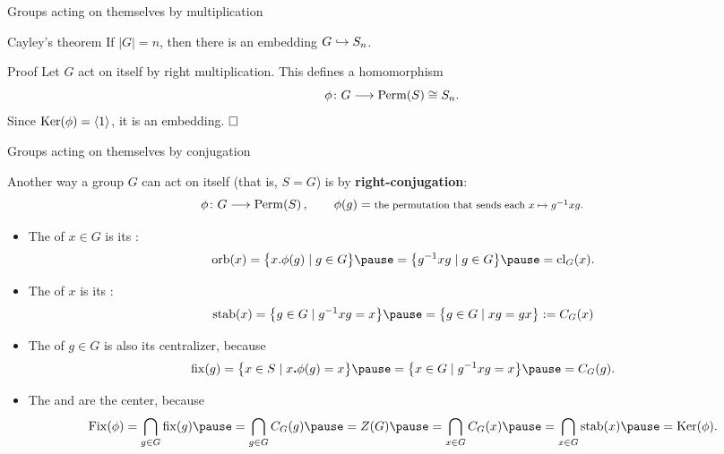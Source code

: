 \documentclass[8pt, handout]{beamer}
\newcommand{\Pause}{\pause}      %
\begin{document}
\begin{frame}{Groups acting on themselves by multiplication}
  \vspace{-1mm}\Pause
  
  \begin{block}{Cayley's theorem}
    If $|G|=n$, then there is an embedding $G\hookrightarrow S_n$.
  \end{block}
  
  \begin{exampleblock}{Proof} \Pause
    Let $G$ act on itself by right multiplication. \Pause This defines
    a homomorphism 
    \[
    \phi\colon G\longrightarrow\operatorname{Perm}(S)\cong S_n.
    \]
    \Pause Since $\operatorname{Ker}(\phi)=\langle1\rangle$, it is an embedding. $\hfill\Box$
  \end{exampleblock}
  
\end{frame}


\begin{frame}{Groups acting on themselves by conjugation}

  Another way a group $G$ can act on itself (that is, $S=G$) is by
  \textbf{right-conjugation}:
  \[
  \phi\colon G\longrightarrow\operatorname{Perm}(S)\,,\qquad \phi(g)=\mbox{\footnotesize the
    permutation that sends each $x\mapsto g^{-1}xg$.}
  \]

  \Pause

  \begin{itemize}
  \item The  of $x\in G$ is its : %
    \[
    \orb(x)=\big\{x.\phi(g)\mid g\in G\big\}\Pause=\big\{g^{-1}xg\mid
    g\in G\big\} \Pause=\cl_G(x).
    \]
    \vspace{-3mm}\Pause
  \item The  of $x$ is its : 
    \[
    \stab(x)=\big\{g\in G\mid g^{-1}xg=x\big\}\Pause
    =\big\{g\in G\mid xg=gx\big\}:=C_G(x)
    \]
    \vspace{-3mm}\Pause
  \item The  of $g\in G$ is
    also its centralizer, because
    \[
    \fix(g)=\big\{x\in S\mid x\Dot\phi(g)=x\big\}\Pause=\big\{x\in G\mid
    g^{-1}xg=x\big\}\Pause=C_G(g).
    \]
    \vspace{-3mm}\Pause
  \item The  and  are the
    center, because
    \[
    \Fix(\phi)=\bigcap_{g\in G}\fix(g)\Pause=\bigcap_{g\in G}C_G(g)\Pause=Z(G)
    \Pause=\bigcap_{x\in G}C_G(x)\Pause=\bigcap_{x\in G}\stab(x)\Pause=\Ker(\phi).
    \]
  \end{itemize}
  
\end{frame}
\end{document}
